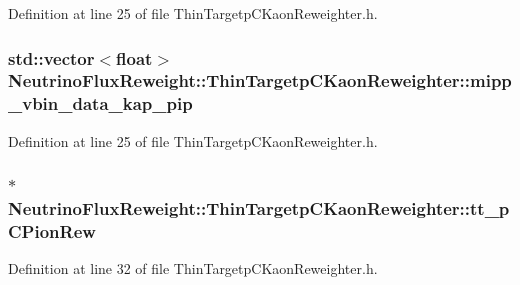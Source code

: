 Definition at line 25 of file Thin\-Targetp\-C\-Kaon\-Reweighter.\-h.

\hypertarget{class_neutrino_flux_reweight_1_1_thin_targetp_c_kaon_reweighter_a6ad9b6cccb6fc522708b1aa5b9070c71}{
\subsubsection[{mipp\-\_\-vbin\-\_\-data\-\_\-kap\-\_\-pip}]{\setlength{\rightskip}{0pt plus 5cm}std\-::vector$<$float$>$ Neutrino\-Flux\-Reweight\-::\-Thin\-Targetp\-C\-Kaon\-Reweighter\-::mipp\-\_\-vbin\-\_\-data\-\_\-kap\-\_\-pip}}\label{class_neutrino_flux_reweight_1_1_thin_targetp_c_kaon_reweighter_a6ad9b6cccb6fc522708b1aa5b9070c71}


Definition at line 25 of file Thin\-Targetp\-C\-Kaon\-Reweighter.\-h.

\hypertarget{class_neutrino_flux_reweight_1_1_thin_targetp_c_kaon_reweighter_ab6dbf86a7f242f29d1f4e67bf1dc7e2f}{
\subsubsection[{tt\-\_\-p\-C\-Pion\-Rew}]{$\ast$ Neutrino\-Flux\-Reweight\-::\-Thin\-Targetp\-C\-Kaon\-Reweighter\-::tt\-\_\-p\-C\-Pion\-Rew\hspace{0.3cm}{\ttfamily [private]}}}\label{class_neutrino_flux_reweight_1_1_thin_targetp_c_kaon_reweighter_ab6dbf86a7f242f29d1f4e67bf1dc7e2f}


Definition at line 32 of file Thin\-Targetp\-C\-Kaon\-Reweighter.\-h.

